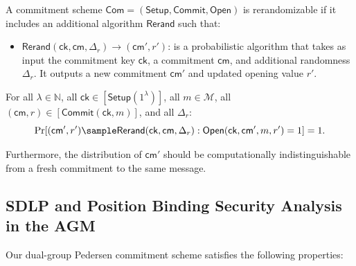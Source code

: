 \begin{definition}[Rerandomizability]
A commitment scheme $\mathsf{Com} = (\mathsf{Setup}, \mathsf{Commit}, \mathsf{Open})$ is rerandomizable if it includes an additional algorithm $\mathsf{Rerand}$ such that:

\begin{itemize}
\item $\mathsf{Rerand}(\mathsf{ck}, \mathsf{cm}, \Delta_r) \rightarrow (\mathsf{cm}', r')$: is a probabilistic algorithm that takes as input the commitment key $\mathsf{ck}$, a commitment $\mathsf{cm}$, and additional randomness $\Delta_r$. It outputs a new commitment $\mathsf{cm}'$ and updated opening value $r'$.
\end{itemize}

For all $\lambda \in \mathbb{N}$, all $\mathsf{ck} \in [\mathsf{Setup}(1^\lambda)]$, all $m \in \mathcal{M}$, all $(\mathsf{cm}, r) \in [\mathsf{Commit}(\mathsf{ck}, m)]$, and all $\Delta_r$:
$$\Pr[(\mathsf{cm}', r') \sample \mathsf{Rerand}(\mathsf{ck}, \mathsf{cm}, \Delta_r) : \mathsf{Open}(\mathsf{ck}, \mathsf{cm}', m, r') = 1] = 1.$$

Furthermore, the distribution of $\mathsf{cm}'$ should be computationally indistinguishable from a fresh commitment to the same message.
\end{definition}



\subsection{SDLP and Position Binding Security Analysis in the AGM}

Our dual-group Pedersen commitment scheme satisfies the following properties:

